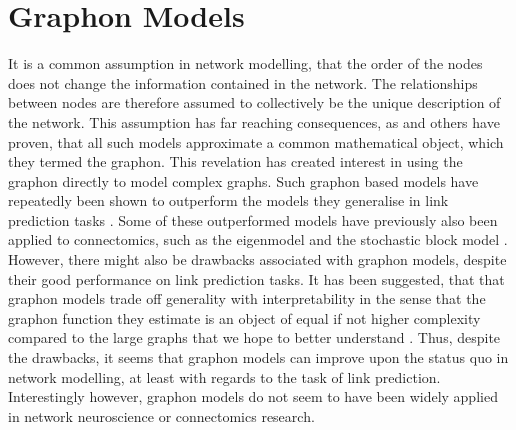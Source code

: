 \documentclass[11pt]{report} %
\begin{document}
\section{Graphon Models}
It is a common assumption in network modelling, that the order of the nodes does not change the information contained in the network. 
The relationships between nodes are therefore assumed to collectively be the unique description of the network.
This assumption has far reaching consequences, as  and others have proven, that all such models approximate a common mathematical object, which they termed the graphon.
This revelation has created interest in using the graphon directly to model complex graphs.
Such graphon based models have repeatedly been shown to outperform the models they generalise in link prediction tasks \cite{lloyd2012, xu2019}.
Some of these outperformed models have previously also been applied to connectomics, such as the eigenmodel \cite{hinne2017} and the stochastic block model \cite{dragana2020}.
However, there might also be drawbacks associated with graphon models, despite their good performance on link prediction tasks. 
It has been suggested, that that graphon models trade off generality with interpretability in the sense that the graphon function they estimate is an object of equal if not higher complexity compared to the large graphs that we hope to better understand \cite{jacobs2014}. Thus, despite the drawbacks, it seems that graphon models can improve upon the status quo in network modelling, at least with regards to the task of link prediction. Interestingly however, graphon models do not seem to have been widely applied in network neuroscience or connectomics research. 
\end{document}
